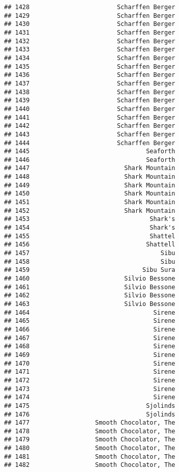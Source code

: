 \documentclass[
]{article}
\begin{document}
\begin{verbatim}
## 1428                        Scharffen Berger
## 1429                        Scharffen Berger
## 1430                        Scharffen Berger
## 1431                        Scharffen Berger
## 1432                        Scharffen Berger
## 1433                        Scharffen Berger
## 1434                        Scharffen Berger
## 1435                        Scharffen Berger
## 1436                        Scharffen Berger
## 1437                        Scharffen Berger
## 1438                        Scharffen Berger
## 1439                        Scharffen Berger
## 1440                        Scharffen Berger
## 1441                        Scharffen Berger
## 1442                        Scharffen Berger
## 1443                        Scharffen Berger
## 1444                        Scharffen Berger
## 1445                                Seaforth
## 1446                                Seaforth
## 1447                          Shark Mountain
## 1448                          Shark Mountain
## 1449                          Shark Mountain
## 1450                          Shark Mountain
## 1451                          Shark Mountain
## 1452                          Shark Mountain
## 1453                                 Shark's
## 1454                                 Shark's
## 1455                                 Shattel
## 1456                                Shattell
## 1457                                    Sibu
## 1458                                    Sibu
## 1459                               Sibu Sura
## 1460                          Silvio Bessone
## 1461                          Silvio Bessone
## 1462                          Silvio Bessone
## 1463                          Silvio Bessone
## 1464                                  Sirene
## 1465                                  Sirene
## 1466                                  Sirene
## 1467                                  Sirene
## 1468                                  Sirene
## 1469                                  Sirene
## 1470                                  Sirene
## 1471                                  Sirene
## 1472                                  Sirene
## 1473                                  Sirene
## 1474                                  Sirene
## 1475                                Sjolinds
## 1476                                Sjolinds
## 1477                  Smooth Chocolator, The
## 1478                  Smooth Chocolator, The
## 1479                  Smooth Chocolator, The
## 1480                  Smooth Chocolator, The
## 1481                  Smooth Chocolator, The
## 1482                  Smooth Chocolator, The

\end{verbatim}
\end{document}
